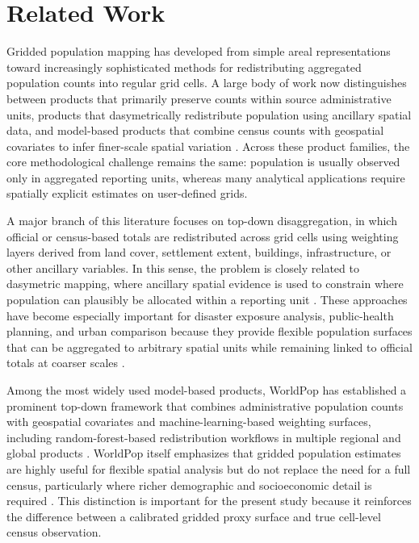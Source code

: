 \section{Related Work}

Gridded population mapping has developed from simple areal representations toward increasingly sophisticated methods for redistributing aggregated population counts into regular grid cells. A large body of work now distinguishes between products that primarily preserve counts within source administrative units, products that dasymetrically redistribute population using ancillary spatial data, and model-based products that combine census counts with geospatial covariates to infer finer-scale spatial variation \cite{Leyk2019,Mennis2009}. Across these product families, the core methodological challenge remains the same: population is usually observed only in aggregated reporting units, whereas many analytical applications require spatially explicit estimates on user-defined grids.

A major branch of this literature focuses on top-down disaggregation, in which official or census-based totals are redistributed across grid cells using weighting layers derived from land cover, settlement extent, buildings, infrastructure, or other ancillary variables. In this sense, the problem is closely related to dasymetric mapping, where ancillary spatial evidence is used to constrain where population can plausibly be allocated within a reporting unit \cite{Mennis2009,Stevens2015}. These approaches have become especially important for disaster exposure analysis, public-health planning, and urban comparison because they provide flexible population surfaces that can be aggregated to arbitrary spatial units while remaining linked to official totals at coarser scales \cite{Leyk2019,WorldPopMethods}.

Among the most widely used model-based products, WorldPop has established a prominent top-down framework that combines administrative population counts with geospatial covariates and machine-learning-based weighting surfaces, including random-forest-based redistribution workflows in multiple regional and global products \cite{Stevens2015,Sorichetta2015,Lloyd2017}. WorldPop itself emphasizes that gridded population estimates are highly useful for flexible spatial analysis but do not replace the need for a full census, particularly where richer demographic and socioeconomic detail is required \cite{WorldPopMethods}. This distinction is important for the present study because it reinforces the difference between a calibrated gridded proxy surface and true cell-level census observation.

